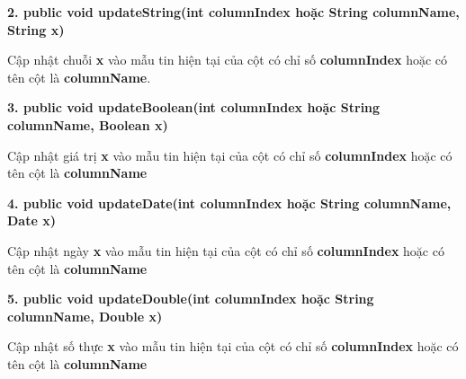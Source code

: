 \textbf{2. public void updateString(int columnIndex hoặc String columnName, String x)}

Cập nhật chuỗi \textbf{x} vào mẫu tin hiện tại của cột có chỉ số \textbf{columnIndex} hoặc có tên cột là \textbf{columnName}.

\textbf{3. public void updateBoolean(int columnIndex hoặc String columnName, Boolean x)}

Cập nhật giá trị \textbf{x} vào mẫu tin hiện tại của cột có chỉ số \textbf{columnIndex} hoặc có tên cột là \textbf{columnName}

\textbf{4. public void updateDate(int columnIndex hoặc String columnName, Date x)}

Cập nhật ngày \textbf{x} vào mẫu tin hiện tại của cột có chỉ số \textbf{columnIndex} hoặc có tên cột là \textbf{columnName}

\textbf{5. public void updateDouble(int columnIndex hoặc String columnName, Double x)}

Cập nhật số thực \textbf{x} vào mẫu tin hiện tại của cột có chỉ số \textbf{columnIndex} hoặc có tên cột là \textbf{columnName}

